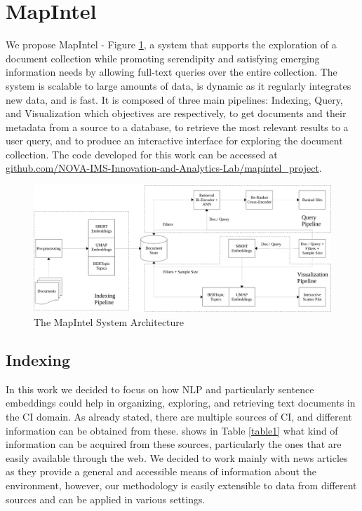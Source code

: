 \documentclass[a4paper]{article}
\begin{document}

\section{MapIntel}
We propose MapIntel - Figure \ref{system_architecture}, a system that supports the exploration of a document collection while promoting serendipity and satisfying emerging information needs by allowing full-text queries over the entire collection.
The system is scalable to large amounts of data, is dynamic as it regularly integrates new data, and is fast. It is composed of three main pipelines: Indexing, Query, and Visualization which objectives are respectively, to get documents and their metadata from a source to a database, to retrieve the most relevant results to a user query, and to produce an interactive interface for exploring the document collection. The code developed for this work can be accessed at \href{https://github.com/NOVA-IMS-Innovation-and-Analytics-Lab/mapintel_project}{github.com/NOVA-IMS-Innovation-and-Analytics-Lab/mapintel\_project}.

\begin{figure}[H]
	\centering
	\includegraphics[scale=0.5]{./assets/system_architecture}
	\caption{The MapIntel System Architecture}
	\label{system_architecture}
\end{figure}

\subsection{Indexing} \label{indexing}
In this work we decided to focus on how NLP and particularly sentence embeddings could help in organizing, exploring, and retrieving text documents in the CI domain. As already stated, there are multiple sources of CI, and different information can be obtained from these. \citet{dey2011} shows in Table \ref{table1} what kind of information can be acquired from these sources, particularly the ones that are easily available through the web. We decided to work mainly with news articles as they provide a general and accessible means of information about the environment, however, our methodology is easily extensible to data from different sources and can be applied in various settings. 
\end{document}
